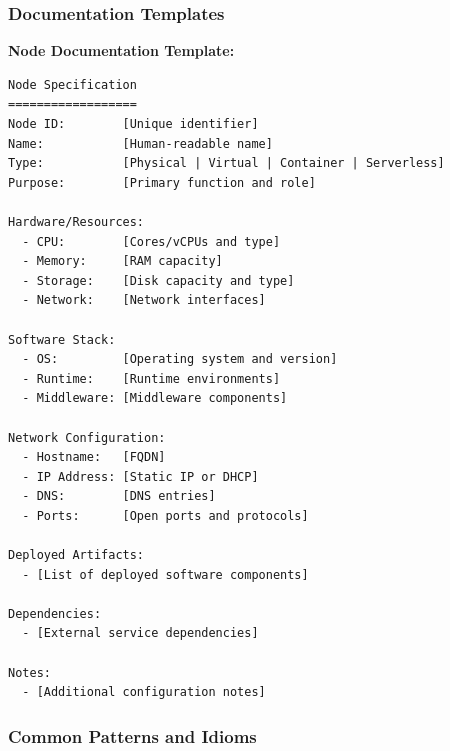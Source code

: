\documentclass[11pt,letterpaper]{article}
\begin{document}
\subsubsection{Documentation Templates}

\textbf{Node Documentation Template:}

\begin{verbatim}
Node Specification
==================
Node ID:        [Unique identifier]
Name:           [Human-readable name]
Type:           [Physical | Virtual | Container | Serverless]
Purpose:        [Primary function and role]

Hardware/Resources:
  - CPU:        [Cores/vCPUs and type]
  - Memory:     [RAM capacity]
  - Storage:    [Disk capacity and type]
  - Network:    [Network interfaces]

Software Stack:
  - OS:         [Operating system and version]
  - Runtime:    [Runtime environments]
  - Middleware: [Middleware components]

Network Configuration:
  - Hostname:   [FQDN]
  - IP Address: [Static IP or DHCP]
  - DNS:        [DNS entries]
  - Ports:      [Open ports and protocols]

Deployed Artifacts:
  - [List of deployed software components]

Dependencies:
  - [External service dependencies]

Notes:
  - [Additional configuration notes]
\end{verbatim}

\subsubsection{Common Patterns and Idioms}
\end{document}
